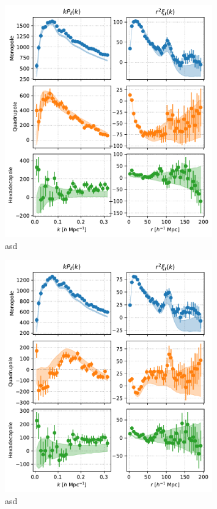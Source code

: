 \begin{figure}
    \centering
    \includegraphics[width=0.8\textwidth]{fig/galaxies/DR16LRG_data_ezmock_prerecon.pdf}
    \caption{asd}
    \label{fig:LRG_data_ezmock_correlations_prerec}
\end{figure}

\begin{figure}
    \centering
    \includegraphics[width=0.8\textwidth]{fig/galaxies/DR16LRG_data_ezmock_postrecon.pdf}
    \caption{asd}
    \label{fig:LRG_data_ezmock_correlations_postrec}
\end{figure}


